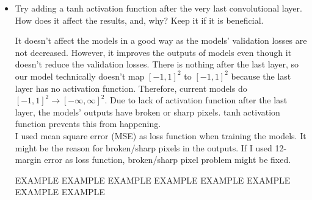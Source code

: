 \documentclass[12pt]{article}
\begin{document}
\begin{itemize}
        \item Try adding a tanh activation function after the very last convolutional layer. How does it affect the results, and, why? Keep it if it is beneficial. 
        
		\begin{minipage}{\textwidth}
			\centering
			\captionsetup{width=.8\textwidth}
		 \end{minipage}
		 
		 It doesn't affect the models in a good way as the models' validation losses are not decreased. However, it improves the outputs of models even though it doesn't reduce the validation losses. There is nothing after the last layer, so our model technically doesn't map $[-1,1]^{2}$ to $[-1,1]^{2}$ because the last layer has no activation function. Therefore, current models do $[-1,1]^{2}\rightarrow[-\infty,\infty]^{2}$. Due to lack of activation function after the last layer, the models' outputs have broken or sharp pixels. tanh activation function prevents this from happening. \\
		 I used mean square error (MSE) as loss function when training the models. It might be the reason for broken/sharp pixels in the outputs. If I used 12-margin error as loss function, broken/sharp pixel problem might be fixed.
		 
		 EXAMPLE EXAMPLE EXAMPLE EXAMPLE EXAMPLE EXAMPLE EXAMPLE EXAMPLE
        

\end{itemize}
\end{document}
